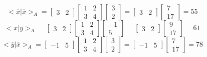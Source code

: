 \documentclass{article}
\begin{document}
\begin{equation*}
    <\overline{x}|\overline{x}>_A = \begin{bmatrix}
        3 & 2
    \end{bmatrix}
    \begin{bmatrix}
        1&2\\3&4
    \end{bmatrix}
    \begin{bmatrix}
        3\\2
    \end{bmatrix}
    =
    \begin{bmatrix}
        3 & 2
    \end{bmatrix}
    \begin{bmatrix}
        7\\17
    \end{bmatrix}
    = 55
\end{equation*}
\begin{equation*}
    <\overline{x}|\overline{y}>_A = \begin{bmatrix}
        3 & 2
    \end{bmatrix}
    \begin{bmatrix}
        1&2\\3&4
    \end{bmatrix}
    \begin{bmatrix}
        -1\\5
    \end{bmatrix}
    =
    \begin{bmatrix}
        3 & 2
    \end{bmatrix}
    \begin{bmatrix}
        9\\17
    \end{bmatrix}
    = 61
\end{equation*}
\begin{equation*}
    <\overline{y}|\overline{x}>_A = \begin{bmatrix}
        -1 & 5
    \end{bmatrix}
    \begin{bmatrix}
        1&2\\3&4
    \end{bmatrix}
    \begin{bmatrix}
        3\\2
    \end{bmatrix}
    =
    \begin{bmatrix}
        -1 & 5
    \end{bmatrix}
    \begin{bmatrix}
        7\\17
    \end{bmatrix}
    = 78
\end{equation*}
\end{document}
